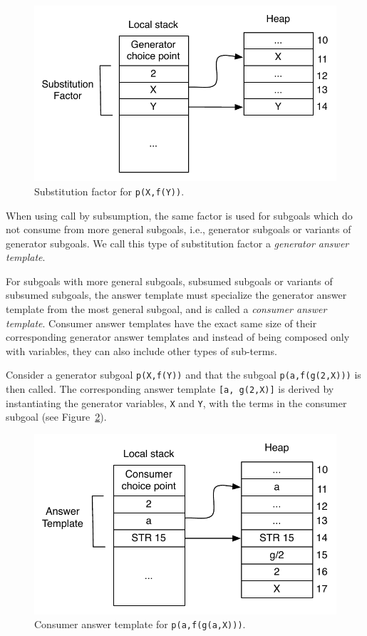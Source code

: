 \begin{figure}[ht]
  \centering
    \includegraphics[scale=0.6]{answer_template_generator.pdf}
  \caption{Substitution factor for \texttt{p(X,f(Y))}.}
  \label{fig:answer_template_generator}
\end{figure}

When using call by subsumption, the same factor is used for subgoals which do not
consume from more general subgoals, i.e., generator subgoals or variants of generator
subgoals. We call this type of substitution factor a \textit{generator answer template}.

For subgoals with more general subgoals, subsumed subgoals or variants of subsumed subgoals,
the answer template must specialize the generator answer template
from the most general subgoal, and is called a \textit{consumer answer template}.
Consumer answer templates have the exact same size of their corresponding generator answer templates
and instead of being composed only with variables, they can also include other types of sub-terms.

Consider a generator subgoal \texttt{p(X,f(Y))} and that the subgoal \texttt{p(a,f(g(2,X)))}
is then called. The corresponding answer template \texttt{[a,~g(2,X)]} is derived by instantiating
the generator variables, \texttt{X} and \texttt{Y}, with the terms in the consumer subgoal
(see Figure~\ref{fig:answer_template_consumer}).

\begin{figure}[ht]
  \centering
    \includegraphics[scale=0.6]{answer_template_consumer.pdf}
  \caption{Consumer answer template for \texttt{p(a,f(g(a,X)))}.}
  \label{fig:answer_template_consumer}
\end{figure}

